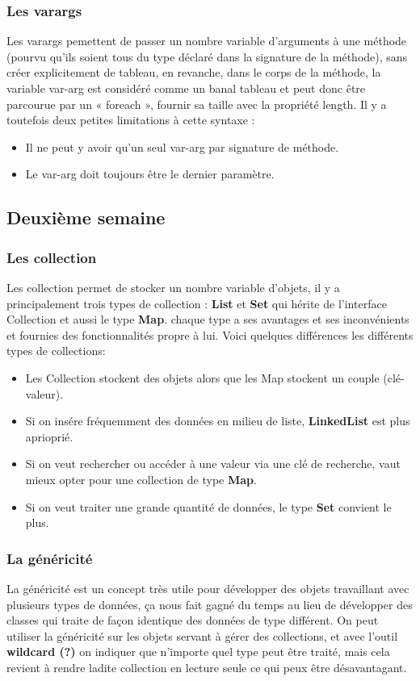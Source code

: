 \documentclass[12pt]{report}
\begin{document}
\subsubsection{Les varargs}
Les varargs pemettent de passer un nombre variable d’arguments à une méthode (pourvu qu’ils soient tous du type déclaré dans la signature de la méthode), sans créer explicitement de tableau, en revanche, dans le corps de la méthode, la variable var-arg est considéré comme un banal tableau et peut donc être parcourue par un « foreach », fournir sa taille avec la propriété length.
Il y a toutefois deux petites limitations à cette syntaxe :
\begin{itemize}
\item Il ne peut y avoir qu’un seul var-arg par signature de méthode.
\item Le var-arg doit toujours être le dernier paramètre.
\end{itemize}

\newpage
\subsection{Deuxième semaine}

\subsubsection{Les collection}
Les collection permet de stocker un nombre variable d'objets, il y a principalement trois types de collection : \textbf{List} et \textbf{Set} qui hérite de l'interface Collection et aussi le type \textbf{Map}. chaque type a ses avantages et ses inconvénients et fournies des fonctionnalités propre à lui.\newline
Voici quelques différences les différents types de collections:
\begin{itemize}
\item Les Collection stockent des objets alors que les Map stockent un couple (clé-valeur).
\item Si on insére fréquemment des données en milieu de liste, \textbf{LinkedList} est plus aprioprié.
\item Si on veut rechercher ou accéder à une valeur via une clé de recherche, vaut mieux opter pour une collection de type \textbf{Map}.
\item Si on veut traiter une grande quantité de données, le type \textbf{Set} convient le plus.
\end{itemize}

\subsubsection{La généricité}
La généricité est un concept très utile pour développer des objets travaillant avec plusieurs types de données, ça nous fait gagné du temps au lieu de développer des classes qui traite de façon identique des données de type différent.\newline
On peut utiliser la généricité sur les objets servant à gérer des collections, et avec l'outil \textbf{wildcard (?)} on indiquer que n'importe quel type peut être traité, mais cela revient à rendre ladite collection en lecture seule ce qui peux être désavantagant. 
\end{document}
